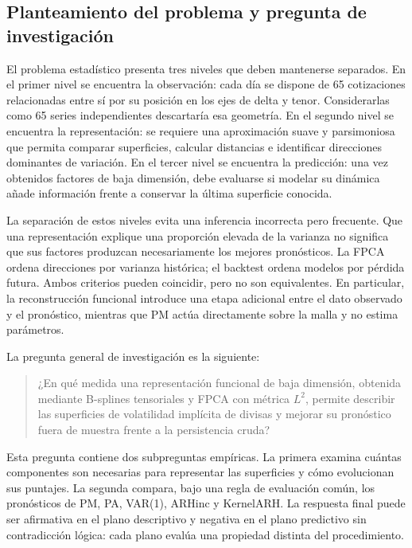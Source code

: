 \documentclass[a4paper,11pt]{article}
\begin{document}
\subsection{Planteamiento del problema y pregunta de investigación}

El problema estadístico presenta tres niveles que deben mantenerse separados. En el primer nivel se encuentra la observación: cada día se dispone de 65 cotizaciones relacionadas entre sí por su posición en los ejes de delta y tenor. Considerarlas como 65 series independientes descartaría esa geometría. En el segundo nivel se encuentra la representación: se requiere una aproximación suave y parsimoniosa que permita comparar superficies, calcular distancias e identificar direcciones dominantes de variación. En el tercer nivel se encuentra la predicción: una vez obtenidos factores de baja dimensión, debe evaluarse si modelar su dinámica añade información frente a conservar la última superficie conocida.

La separación de estos niveles evita una inferencia incorrecta pero frecuente. Que una representación explique una proporción elevada de la varianza no significa que sus factores produzcan necesariamente los mejores pronósticos. La FPCA ordena direcciones por varianza histórica; el backtest ordena modelos por pérdida futura. Ambos criterios pueden coincidir, pero no son equivalentes. En particular, la reconstrucción funcional introduce una etapa adicional entre el dato observado y el pronóstico, mientras que PM actúa directamente sobre la malla y no estima parámetros.

La pregunta general de investigación es la siguiente:

\begin{quote}
¿En qué medida una representación funcional de baja dimensión, obtenida mediante B-splines tensoriales y FPCA con métrica \(L^2\), permite describir las superficies de volatilidad implícita de divisas y mejorar su pronóstico fuera de muestra frente a la persistencia cruda?
\end{quote}

Esta pregunta contiene dos subpreguntas empíricas. La primera examina cuántas componentes son necesarias para representar las superficies y cómo evolucionan sus puntajes. La segunda compara, bajo una regla de evaluación común, los pronósticos de PM, PA, VAR(1), ARHinc y KernelARH. La respuesta final puede ser afirmativa en el plano descriptivo y negativa en el plano predictivo sin contradicción lógica: cada plano evalúa una propiedad distinta del procedimiento.
\end{document}
